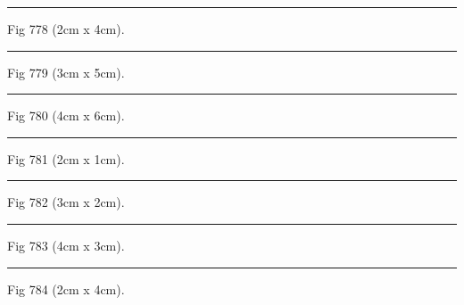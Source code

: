 \documentclass[a4paper,11pt]{article}
\begin{document}
\begin{swarmwrap}%
  \begin{minipage}[t]{2cm}
    \centering
    \rule{\linewidth}{4cm}
    {\footnotesize Fig 778 (2cm x 4cm).}
  \end{minipage}%
\end{swarmwrap}%
\swarmwrapnext
\lipsum[28]%

\begin{swarmwrap}%
  \begin{minipage}[t]{3cm}
    \centering
    \rule{\linewidth}{5cm}
    {\footnotesize Fig 779 (3cm x 5cm).}
  \end{minipage}%
\end{swarmwrap}%
\swarmwrapnext
\lipsum[29]%

\begin{swarmwrap}%
  \begin{minipage}[t]{4cm}
    \centering
    \rule{\linewidth}{6cm}
    {\footnotesize Fig 780 (4cm x 6cm).}
  \end{minipage}%
\end{swarmwrap}%
\swarmwrapnext
\lipsum[30]%

\begin{swarmwrap}%
  \begin{minipage}[t]{2cm}
    \centering
    \rule{\linewidth}{1cm}
    {\footnotesize Fig 781 (2cm x 1cm).}
  \end{minipage}%
\end{swarmwrap}%
\swarmwrapnext
\lipsum[31]%

\begin{swarmwrap}%
  \begin{minipage}[t]{3cm}
    \centering
    \rule{\linewidth}{2cm}
    {\footnotesize Fig 782 (3cm x 2cm).}
  \end{minipage}%
\end{swarmwrap}%
\swarmwrapnext
\lipsum[32]%

\begin{swarmwrap}%
  \begin{minipage}[t]{4cm}
    \centering
    \rule{\linewidth}{3cm}
    {\footnotesize Fig 783 (4cm x 3cm).}
  \end{minipage}%
\end{swarmwrap}%
\swarmwrapnext
\lipsum[33]%

\begin{swarmwrap}%
  \begin{minipage}[t]{2cm}
    \centering
    \rule{\linewidth}{4cm}
    {\footnotesize Fig 784 (2cm x 4cm).}
  \end{minipage}%
\end{swarmwrap}%
\swarmwrapnext
\lipsum[34]%
\end{document}
